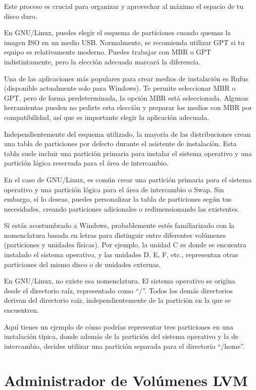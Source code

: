 \documentclass[
  letterpaper,
  DIV=11,
  numbers=noendperiod]{scrartcl}
\begin{document}
Este proceso es crucial para organizar y aprovechar al máximo el espacio
de tu disco duro.

En GNU/Linux, puedes elegir el esquema de particiones cuando quemas la
imagen ISO en un medio USB. Normalmente, se recomienda utilizar GPT si
tu equipo es relativamente moderno. Puedes trabajar con MBR o GPT
indistintamente, pero la elección adecuada marcará la diferencia.

Una de las aplicaciones más populares para crear medios de instalación
es Rufus (disponible actualmente solo para Windows). Te permite
seleccionar MBR o GPT, pero de forma predeterminada, la opción MBR está
seleccionada. Algunas herramientas pueden no pedirte esta elección y
preparar los medios con MBR por compatibilidad, así que es importante
elegir la aplicación adecuada.

Independientemente del esquema utilizado, la mayoría de las
distribuciones crean una tabla de particiones por defecto durante el
asistente de instalación. Esta tabla suele incluir una partición
primaria para instalar el sistema operativo y una partición lógica
reservada para el área de intercambio.

En el caso de GNU/Linux, es común crear una partición primaria para el
sistema operativo y una partición lógica para el área de intercambio o
Swap. Sin embargo, si lo deseas, puedes personalizar la tabla de
particiones según tus necesidades, creando particiones adicionales o
redimensionando las existentes.

Si estás acostumbrado a Windows, probablemente estés familiarizado con
la nomenclatura basada en letras para distinguir entre diferentes
volúmenes (particiones y unidades físicas). Por ejemplo, la unidad C es
donde se encuentra instalado el sistema operativo, y las unidades D, E,
F, etc., representan otras particiones del mismo disco o de unidades
externas.

En GNU/Linux, no existe esa nomenclatura. El sistema operativo se
origina desde el directorio raíz, representado como ``/''. Todos los
demás directorios derivan del directorio raíz, independientemente de la
partición en la que se encuentren.

Aquí tienes un ejemplo de cómo podrías representar tres particiones en
una instalación típica, donde además de la partición del sistema
operativo y la de intercambio, decides utilizar una partición separada
para el directorio ``/home''.

\hypertarget{administrador-de-voluxfamenes-lvm}{%
\section{Administrador de Volúmenes
LVM}\label{administrador-de-voluxfamenes-lvm}}
\end{document}

